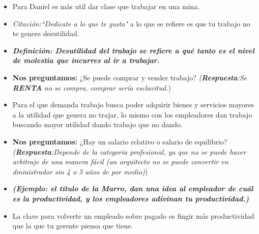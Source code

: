 \begin{itemize}
    \item Para Daniel es más util dar clase que trabajar en una mina. 
    
    \item \emph{Citación:``Dedicate a lo que te gusta"} a lo que se refiere es que tu trabajo no te genere desutilidad.
    
    \item \textbf{\emph{Definición: Desutilidad del trabajo se refiere a qué tanto es el nivel de molestia que incurres al ir a trabajar.}}
    
    \item \textbf{Nos preguntamos:} ¿Se puede comprar y vender trabajo? \emph{(\textbf{Respuesta}:Se \textbf{RENTA} no se compra, comprar sería esclavitud.})
    
    \item Para el que demanda trabajo busca poder adquirir bienes y servicios mayores a la utilidad que genera no trajar, lo mismo con los empleadores dan trabajo buscando mayor utilidad dando trabajo que no dando.
    
    \item \textbf{Nos preguntamos:} ¿Hay un salario relativo o salario de equilibrio? \emph{(\textbf{Respuesta}:Depende de la categoria profesional, ya que no se puede hacer arbitraje de una manera fácil (un arquitecto no se puede convertir en dministrador sin 4 o 5 años de por medio)})
    
    \item \textbf{\emph{(Ejemplo: el título de la Marro, dan una idea al empleador de cuál es la productividad, y los empleadores adivinan tu productividad.)}}
    
    \item La clave para volverte un empleado sobre pagado es fingir más productividad que la que tu gerente piensa que tiene.
\end{itemize}

